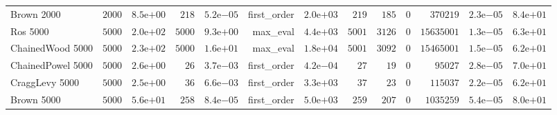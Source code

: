 \begin{longtable}[c]{lrrrrrrrrrrrr}
Brown 2000 & \( 2000\) & \( 8.5\)e\(+00\) & \(  218\) & \( 5.2\)e\(-05\) & first\_order & \( 2.0\)e\(+03\) & \(  219\) & \(  185\) & \(    0\) & \(370219\) & \( 2.3\)e\(-05\) & \( 8.4\)e\(+01\) \\
Ros 5000 & \( 5000\) & \( 2.0\)e\(+02\) & \( 5000\) & \( 9.3\)e\(+00\) & max\_eval & \( 4.4\)e\(+03\) & \( 5001\) & \( 3126\) & \(    0\) & \(15635001\) & \( 1.3\)e\(-05\) & \( 6.3\)e\(+01\) \\
ChainedWood 5000 & \( 5000\) & \( 2.3\)e\(+02\) & \( 5000\) & \( 1.6\)e\(+01\) & max\_eval & \( 1.8\)e\(+04\) & \( 5001\) & \( 3092\) & \(    0\) & \(15465001\) & \( 1.5\)e\(-05\) & \( 6.2\)e\(+01\) \\
ChainedPowel 5000 & \( 5000\) & \( 2.6\)e\(+00\) & \(   26\) & \( 3.7\)e\(-03\) & first\_order & \( 4.2\)e\(-04\) & \(   27\) & \(   19\) & \(    0\) & \(95027\) & \( 2.8\)e\(-05\) & \( 7.0\)e\(+01\) \\
CraggLevy 5000 & \( 5000\) & \( 2.5\)e\(+00\) & \(   36\) & \( 6.6\)e\(-03\) & first\_order & \( 3.3\)e\(+03\) & \(   37\) & \(   23\) & \(    0\) & \(115037\) & \( 2.2\)e\(-05\) & \( 6.2\)e\(+01\) \\
Brown 5000 & \( 5000\) & \( 5.6\)e\(+01\) & \(  258\) & \( 8.4\)e\(-05\) & first\_order & \( 5.0\)e\(+03\) & \(  259\) & \(  207\) & \(    0\) & \(1035259\) & \( 5.4\)e\(-05\) & \( 8.0\)e\(+01\) \\
\hline 
\end{longtable}



